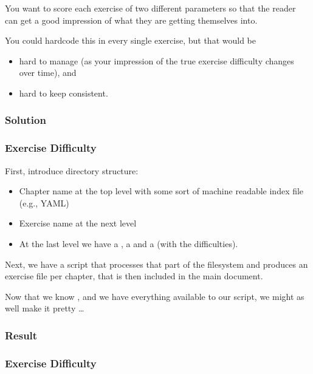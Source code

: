 {\begin{frame}[fragile]
  \vspace{5mm}
  You want to score each exercise of two different parameters so that the reader can get a good impression of what they are getting themselves into.
  
  \vspace{5mm}
  You could hardcode this in every single exercise, but that would be
  \begin{itemize}
    \item hard to manage (as your impression of the true exercise difficulty changes over time), and
    \item hard to keep consistent.
  \end{itemize}
\end{frame}

\subsubsection{Solution}
\begin{frame}[fragile]
  \frametitle{Exercise Difficulty }
  \vspace{3mm}
  First, introduce directory structure:
  \begin{itemize}
    \item Chapter name at the top level with some sort of machine readable index file (e.g., YAML)
    \item Exercise name at the next level
    \item At the last level we have a , a  and a  (with the difficulties).
  \end{itemize}
  
  \vspace{5mm}
  Next, we have a script that processes that part of the filesystem and produces an exercise file per chapter, that is then included in the main document.
  
  \vspace{5mm}
  Now that we know \TikZ, and we have everything available to our script, we might as well make it pretty \ldots
\end{frame}

\subsubsection{Result}
\begin{frame}[fragile]
  \frametitle{Exercise Difficulty }
\end{frame}

}
